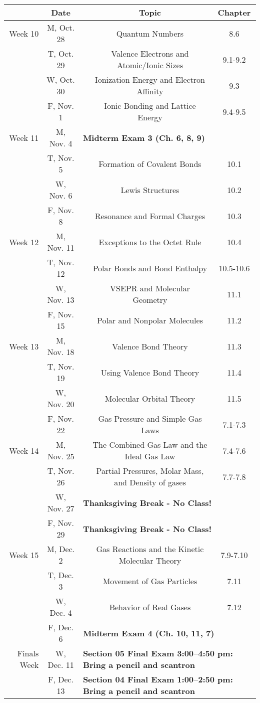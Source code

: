 \documentclass[12pt, letterpaper]{article}
\begin{document}
\noindent\hspace{-1.5em}
\begin{tabular}{rcccc}
& Date && Topic & Chapter\\
\midrule
Week 10 & M, Oct. 28&& Quantum Numbers & 8.6\\
& T, Oct. 29&& Valence Electrons and Atomic/Ionic Sizes & 9.1-9.2\\
& W, Oct. 30&& Ionization Energy and Electron Affinity & 9.3\\
& F, Nov. 1&& Ionic Bonding and Lattice Energy & 9.4-9.5\\
\midrule
Week 11 & M, Nov. 4& \multicolumn{3}{l}{\textbf{Midterm Exam 3 (Ch. 6, 8, 9)}}\\
& T, Nov. 5&& Formation of Covalent Bonds & 10.1\\
& W, Nov. 6&& Lewis Structures & 10.2\\
& F, Nov. 8&& Resonance and Formal Charges & 10.3\\
\midrule
Week 12 & M, Nov. 11&& Exceptions to the Octet Rule & 10.4\\
& T, Nov. 12&& Polar Bonds and Bond Enthalpy & 10.5-10.6\\
& W, Nov. 13&& VSEPR and Molecular Geometry & 11.1\\
& F, Nov. 15&& Polar and Nonpolar Molecules & 11.2\\
\midrule
Week 13 & M, Nov. 18&& Valence Bond Theory & 11.3\\
& T, Nov. 19&& Using Valence Bond Theory & 11.4\\
& W, Nov. 20&& Molecular Orbital Theory & 11.5\\
& F, Nov. 22&& Gas Pressure and Simple Gas Laws & 7.1-7.3\\
\midrule
Week 14 & M, Nov. 25&& The Combined Gas Law and the Ideal Gas Law & 7.4-7.6\\
& T, Nov. 26&& Partial Pressures, Molar Mass, and Density of gases & 7.7-7.8\\
& W, Nov. 27& \multicolumn{3}{l}{\textbf{Thanksgiving Break - No Class!}}\\
& F, Nov. 29& \multicolumn{3}{l}{\textbf{Thanksgiving Break - No Class!}}\\
\midrule
Week 15 & M, Dec. 2&& Gas Reactions and the Kinetic Molecular Theory & 7.9-7.10\\
& T, Dec. 3&& Movement of Gas Particles & 7.11\\
& W, Dec. 4&& Behavior of Real Gases & 7.12\\
& F, Dec. 6& \multicolumn{3}{l}{\textbf{Midterm Exam 4 (Ch. 10, 11, 7)}}\\
	\midrule
	\midrule
	Finals Week & W, Dec. 11& \multicolumn{3}{l}{\textbf{Section 05 Final Exam 3:00--4:50 pm: Bring a pencil and scantron}}\\
		& F, Dec. 13& \multicolumn{3}{l}{\textbf{Section 04 Final Exam 1:00--2:50 pm: Bring a pencil and scantron}}\\
\end{tabular}
\end{document}
